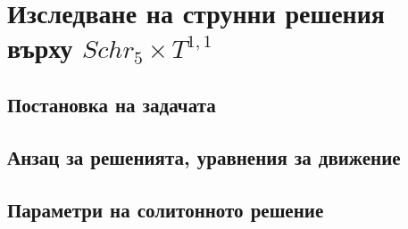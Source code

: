 \documentclass[bulg]{beamer}
\begin{document}
  \section{Изследване на струнни решения върху $Schr_5\times T^{1,1}$}
  \SectionPage
  \subsection{Постановка на задачата}
  \subsection{Анзац за решенията, уравнения за движение}
  \subsection{Параметри на солитонното решение}
\end{document}
